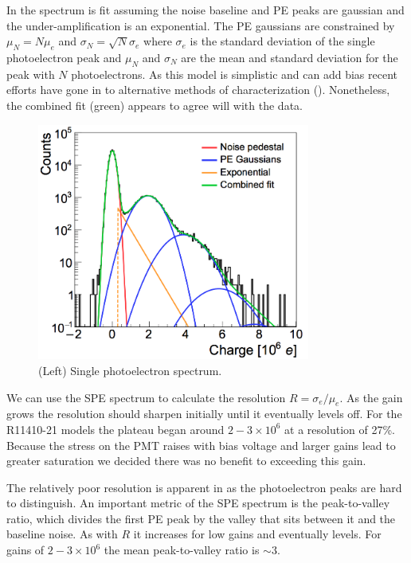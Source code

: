 In  the spectrum is fit assuming the noise baseline and PE peaks are gaussian and the under-amplification is
an exponential.  The PE gaussians are constrained by $\mu_{N} = N \mu_{e}$ and $\sigma_{N} = \sqrt{N} \sigma_{e}$ where $\sigma_{e}$ is the
standard deviation of the single photoelectron peak and $\mu_{N}$ and $\sigma_{N}$ are the mean and standard deviation for the peak with
$N$ photoelectrons.  As this model is simplistic and can add bias recent efforts have gone in to alternative methods
of characterization ().  Nonetheless, the combined fit (green) appears to agree will with the data.

\begin{figure}
\centering
\includegraphics[width=0.8\textwidth]{SPESpectrum}
\caption{(Left) Single photoelectron spectrum.}
\label{fig:xenon1t_pmt_spe}
\end{figure}

We can use the SPE spectrum to calculate the resolution $R = \sigma_{e} / \mu_{e}$.  As the gain grows the resolution should sharpen
initially until it eventually levels off.  For the R11410-21 models the plateau began around $2-3 \times 10^{6}$ at a resolution of
27\%.  Because the stress on the PMT raises with bias voltage and larger gains lead to greater saturation we decided there was no benefit
to exceeding this gain.

The relatively poor resolution is apparent in  as the photoelectron peaks are hard to distinguish.  An
important metric of the SPE spectrum is the peak-to-valley ratio, which divides the first PE peak by the valley that sits between it and
the baseline noise.  As with $R$ it increases for low gains and eventually levels.  For gains of $2-3 \times 10^{6}$ the mean
peak-to-valley ratio is ${\sim} 3$.



